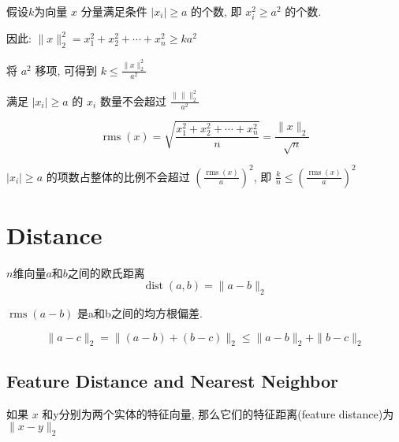 \begin{theorem}
    假设$k$为向量 $ x $ 分量满足条件 $ \left|x_{i}\right| \geq a $ 的个数, 即 $ x_{i}^{2} \geq a^{2} $ 的个数. 

    因此: $ \|x\|_{2}^{2}=x_{1}^{2}+x_{2}^{2}+\cdots+x_{n}^{2} \geq k a^{2} $

    将 $ a^{2} $ 移项, 可得到 $ k \leq \frac{\|x\|_{2}^{2}}{a^{2}} $

    满足 $ \left|x_{i}\right| \geq a $ 的 $ x_{i} $ 数量不会超过 $ \frac{\|\| \|_{2}^{2}}{a^{2}} $
\end{theorem}

\begin{corollary}
    $$ \operatorname{rms}(x)=\sqrt{\frac{x_{1}^{2}+x_{2}^{2}+\cdots+x_{n}^{2}}{n}}=\frac{\|x\|_{2}}{\sqrt{n}} $$

    $ \left|x_{i}\right| \geq a $ 的项数占整体的比例不会超过 $ \left(\frac{\operatorname{rms}(x)}{a}\right)^{2} $, 即 $ \frac{k}{n} \leq\left(\frac{\operatorname{rms}(x)}{a}\right)^{2} $
\end{corollary}

\section{Distance}

\begin{definition}
    $n$维向量$a$和$b$之间的欧氏距离
    $$ \operatorname{dist}(a, b)=\|a-b\|_{2} $$
\end{definition}

\begin{definition}
    $ \operatorname{rms}(a-b) $ 是a和b之间的均方根偏差.
\end{definition}

\begin{theorem}
    $$ \|a-c\|_{2}=\|(a-b)+(b-c)\|_{2} \leq\|a-b\|_{2}+\|b-c\|_{2} $$
\end{theorem}

\subsection{Feature Distance and Nearest Neighbor}

\begin{definition}
    如果 $ x $ 和y分别为两个实体的特征向量, 那么它们的特征距离(feature distance)为 $ \|x-y\|_{2} $
\end{definition}

